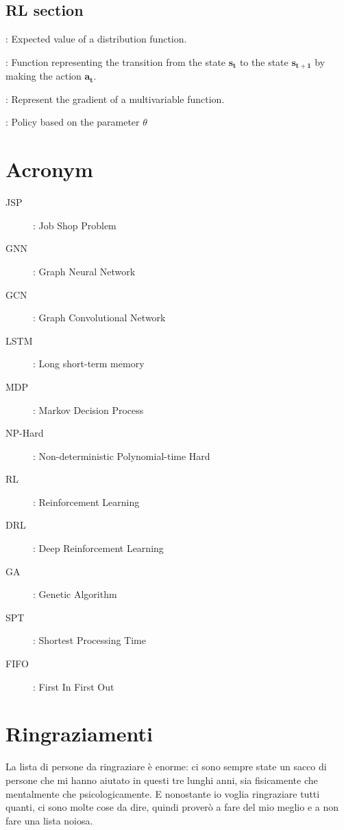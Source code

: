 \documentclass[12pt]{book}
\begin{document}
\begin{description}
\section*{RL section}
  \item[$\boldsymbol{\mathbb{E}}$]: Expected value of a distribution function.
  \item[$\mathbf{T(s_{t+1}|s_t,a_t)}$]: Function representing the transition from the state $\mathbf{s_t}$ to the state $\mathbf{s_{t+1}}$ by making the action $\mathbf{a_t}$. 
  \item[$\boldsymbol{\nabla}$]: Represent the gradient of a multivariable function.
  \item[$\boldsymbol{\pi_\theta}$]: Policy based on the parameter $\theta$
  
\end{description}

\chapter*{Acronym}

\begin{description}
  \item[JSP]: Job Shop Problem
  \item[GNN]: Graph Neural Network
  \item[GCN]: Graph Convolutional Network
  \item[LSTM]: Long short-term memory
  \item[MDP]: Markov Decision Process
  \item[NP-Hard]: Non-deterministic Polynomial-time Hard
  \item[RL]: Reinforcement Learning
  \item[DRL]: Deep Reinforcement Learning
  \item[GA]: Genetic Algorithm
  \item[SPT]: Shortest Processing Time
  \item[FIFO]: First In First Out
  
\end{description}

\printbibliography

\chapter{Ringraziamenti}

La lista di persone da ringraziare è enorme: ci sono sempre state un sacco di persone che mi hanno aiutato in questi tre lunghi anni, sia fisicamente che mentalmente che psicologicamente. E nonostante io voglia ringraziare tutti quanti, ci sono molte cose da dire, quindi proverò a fare del mio meglio e a non fare una lista noiosa.
\end{document}
